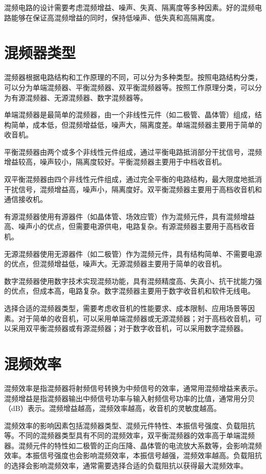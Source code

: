 \documentclass[12pt,UTF8]{ctexbook}
\begin{document}
混频电路的设计需要考虑混频增益、噪声、失真、隔离度等多种因素。好的混频电路能够在保证高混频增益的同时，保持低噪声、低失真和高隔离度。

\section{混频器类型}

混频器根据电路结构和工作原理的不同，可以分为多种类型。按照电路结构分类，可以分为单端混频器、平衡混频器、双平衡混频器等。按照工作原理分类，可以分为有源混频器、无源混频器、数字混频器等。

单端混频器是最简单的混频器，由一个非线性元件（如二极管、晶体管）组成，结构简单，成本低，但混频增益低，噪声大，隔离度差。单端混频器主要用于简单的收音机。

平衡混频器由两个或多个非线性元件组成，通过平衡电路抵消部分干扰信号，混频增益较高，噪声较小，隔离度较好。平衡混频器主要用于中档收音机。

双平衡混频器由四个非线性元件组成，通过完全平衡的电路结构，最大限度地抵消干扰信号，混频增益高，噪声小，隔离度好。双平衡混频器主要用于高档收音机和通信接收机。

有源混频器使用有源器件（如晶体管、场效应管）作为混频元件，具有混频增益高、噪声小的优点，但需要电源供电，电路复杂。有源混频器主要用于高档收音机。

无源混频器使用无源器件（如二极管）作为混频元件，具有结构简单、不需要电源的优点，但混频增益低，噪声大。无源混频器主要用于简单的收音机。

数字混频器使用数字技术实现混频功能，具有混频精度高、失真小、抗干扰能力强的优点，但成本高，电路复杂。数字混频器主要用于数字收音机和软件无线电。

选择合适的混频器类型，需要考虑收音机的性能要求、成本限制、应用场景等因素。对于简单的收音机，可以采用单端混频器或无源混频器；对于高档收音机，可以采用双平衡混频器或有源混频器；对于数字收音机，可以采用数字混频器。

\section{混频效率}

混频效率是指混频器将射频信号转换为中频信号的效率，通常用混频增益来表示。混频增益是指混频器输出中频信号功率与输入射频信号功率的比值，通常用分贝（dB）表示。混频增益越高，混频效率越高，收音机的灵敏度越高。

混频效率的影响因素包括混频器类型、混频元件特性、本振信号强度、负载阻抗等。不同的混频器类型具有不同的混频效率，双平衡混频器的效率高于单端混频器。混频元件的特性如二极管的正向压降、晶体管的电流放大系数等，会影响混频效率。本振信号强度也会影响混频效率，本振信号越强，混频效率越高。负载阻抗的选择会影响混频效率，通常需要选择合适的负载阻抗以获得最大混频效率。
\end{document}
